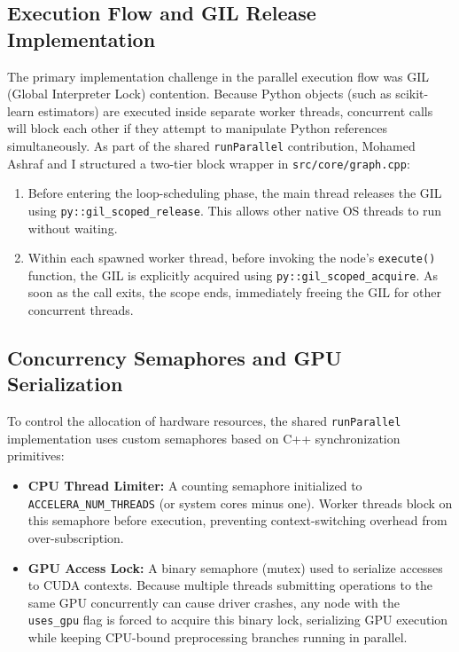 \documentclass[12pt,a4paper,oneside]{report}
\newcommand{\modulepath}[1]{\texttt{#1}}
\begin{document}
\subsection{Execution Flow and GIL Release Implementation}
The primary implementation challenge in the parallel execution flow was GIL (Global Interpreter Lock) contention. Because Python objects (such as scikit-learn estimators) are executed inside separate worker threads, concurrent calls will block each other if they attempt to manipulate Python references simultaneously. As part of the shared \modulepath{runParallel} contribution, Mohamed Ashraf and I structured a two-tier block wrapper in \modulepath{src/core/graph.cpp}:
\begin{enumerate}
    \item Before entering the loop-scheduling phase, the main thread releases the GIL using \texttt{py::gil\_scoped\_release}. This allows other native OS threads to run without waiting.
    \item Within each spawned worker thread, before invoking the node's \texttt{execute()} function, the GIL is explicitly acquired using \texttt{py::gil\_scoped\_acquire}. As soon as the call exits, the scope ends, immediately freeing the GIL for other concurrent threads.
\end{enumerate}

\subsection{Concurrency Semaphores and GPU Serialization}
To control the allocation of hardware resources, the shared \modulepath{runParallel} implementation uses custom semaphores based on C++ synchronization primitives:
\begin{itemize}[leftmargin=*]
    \item \textbf{CPU Thread Limiter:} A counting semaphore initialized to \texttt{ACCELERA\_NUM\_THREADS} (or system cores minus one). Worker threads block on this semaphore before execution, preventing context-switching overhead from over-subscription.
    \item \textbf{GPU Access Lock:} A binary semaphore (mutex) used to serialize accesses to CUDA contexts. Because multiple threads submitting operations to the same GPU concurrently can cause driver crashes, any node with the \texttt{uses\_gpu} flag is forced to acquire this binary lock, serializing GPU execution while keeping CPU-bound preprocessing branches running in parallel.
\end{itemize}
\end{document}
